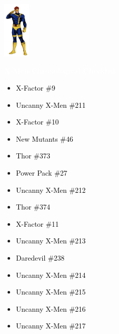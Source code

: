 \documentclass[12pt]{article}
\newcommand{\checkbox}{\raisebox{0.0ex}{\fbox{\rule{0ex}{1.5ex} \rule{1.5ex}{0ex}}}}
\begin{document}
\begin{center}
    \vspace*{2cm}
    \includegraphics[width=0.1\textwidth]{cyclops.png}
    \vspace{0.3cm}

    {\Huge \textbf{\textcolor{white}{X-Men Chronological Checklist}}}
\end{center}

\vspace{0.3cm}
\noindent
\begin{tcolorbox}[
  colback=white!95!gray,
  colframe=black,
  width=\textwidth,
  arc=4mm,
  auto outer arc,
  boxrule=0.8pt,
  left=8pt,right=8pt,top=8pt,bottom=8pt
]
\begin{itemize}[left=0pt,label={\checkbox}]
  \item \textcolor{black}{X-Factor \#9}
  \item \textcolor{black}{Uncanny X-Men \#211}
  \item \textcolor{black}{X-Factor \#10}
  \item \textcolor{black}{New Mutants \#46}
  \item \textcolor{black}{Thor \#373}
  \item \textcolor{black}{Power Pack \#27}
  \item \textcolor{black}{Uncanny X-Men \#212}
  \item \textcolor{black}{Thor \#374}
  \item \textcolor{black}{X-Factor \#11}
  \item \textcolor{black}{Uncanny X-Men \#213}
  \item \textcolor{black}{Daredevil \#238}
  \item \textcolor{black}{Uncanny X-Men \#214}
  \item \textcolor{black}{Uncanny X-Men \#215}
  \item \textcolor{black}{Uncanny X-Men \#216}
  \item \textcolor{black}{Uncanny X-Men \#217}
\end{itemize}
\end{tcolorbox}
\end{document}
